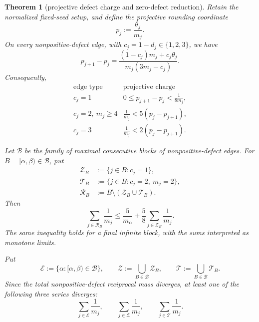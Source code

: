 \documentclass[11pt]{article}
\newtheorem{theorem}{Theorem}
\begin{document}
\begin{theorem}[projective defect charge and zero-defect reduction]
Retain the normalized fixed-seed setup, and define the projective rounding
coordinate
\[
  p_j:=\frac{\theta_j}{m_j}.
\tag{114}
\]
On every nonpositive-defect edge, with $c_j=1-d_j\in\{1,2,3\}$, we have
\[
\boxed{
  p_{j+1}-p_j
  =\frac{(1-c_j)m_j+c_j\theta_j}
         {m_j(3m_j-c_j)}.}
\tag{115}
\]
Consequently,
\[
\begin{array}{c|c}
\text{edge type}&\text{projective charge}\\ \hline
c_j=1&
  0\leq p_{j+1}-p_j<\displaystyle\frac1{8m_j},\\[2mm]
c_j=2,\ m_j\geq4&
  \displaystyle\frac1{m_j}<5(p_j-p_{j+1}),\\[2mm]
c_j=3&
  \displaystyle\frac1{m_j}<2(p_j-p_{j+1}).
\end{array}
\tag{116}
\]

Let $\mathcal B$ be the family of maximal consecutive blocks of
nonpositive-defect edges.  For $B=[\alpha,\beta)\in\mathcal B$, put
\[
\begin{aligned}
  \mathcal Z_B&:=\{j\in B:c_j=1\},\\
  \mathcal T_B&:=\{j\in B:c_j=2,\ m_j=2\},\\
  \mathcal R_B&:=B\setminus(\mathcal Z_B\cup\mathcal T_B).
\end{aligned}
\tag{117}
\]
Then
\[
\boxed{
  \sum_{j\in\mathcal R_B}\frac1{m_j}
  \leq\frac5{m_\alpha}
  +\frac58\sum_{j\in\mathcal Z_B}\frac1{m_j}.}
\tag{118}
\]
The same inequality holds for a final infinite block, with the sums
interpreted as monotone limits.

Put
\[
  \mathcal E:=\{\alpha:[\alpha,\beta)\in\mathcal B\},
  \qquad
  \mathcal Z:=\bigcup_{B\in\mathcal B}\mathcal Z_B,
  \qquad
  \mathcal T:=\bigcup_{B\in\mathcal B}\mathcal T_B.
\tag{119}
\]
Since the total nonpositive-defect reciprocal mass diverges, at least one of
the following three series diverges:
\[
\boxed{
  \sum_{j\in\mathcal E}\frac1{m_j},
  \qquad
  \sum_{j\in\mathcal Z}\frac1{m_j},
  \qquad
  \sum_{j\in\mathcal T}\frac1{m_j}.}
\tag{120}
\]


\end{theorem}
\end{document}
